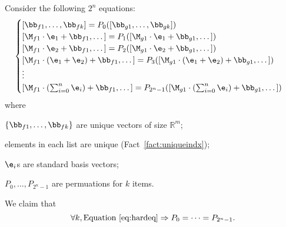 \begin{claim}
Consider the following $2^n$ equations:
    \begin{align}
        \begin{cases}
            [\bb_{f1},\dots,\bb_{fk}] = P_0([\bb_{g1},\dots,\bb_{gk}])\\
            [\M_{f1}\cdot \e_1 + \bb_{f1},\dots] = P_1([\M_{g1}\cdot \e_1 + \bb_{g1}, \dots])\\
            [\M_{f1}\cdot \e_2 + \bb_{f1},\dots] = P_2([\M_{g1}\cdot \e_2 + \bb_{g1}, \dots])\\
            [\M_{f1}\cdot (\e_1+\e_2) + \bb_{f1},\dots] = P_3([\M_{g1}\cdot (\e_1+\e_2) + \bb_{g1}, \dots])\\
            \vdots\\
            [\M_{f1}\cdot (\sum_{i=0}^{n}\e_i) + \bb_{f1},\dots] = P_{2^n-1}([\M_{g1}\cdot (\sum_{i=0}^n\e_i) + \bb_{g1}, \dots])
        \end{cases}
        \label{eq:hardeq}
    \end{align}
    where
    \begin{myitemize}
        \item $\{\bb_{f1},\dots,\bb_{fk}\}$ are unique vectors of size $\mathbb{R}^m$;
        \item elements in each list are unique (Fact~\ref{fact:uniqueindx});
        \item $\e_i$s are standard basis vectors;
        \item $P_0, \dots, P_{2^n-1}$ are permuations for $k$ items.
    \end{myitemize}

    We claim that
 \[
     \forall k, \text{Equation~\ref{eq:hardeq}} \Rightarrow P_0=\cdots=P_{2^n-1}.
\]
    \label{claim:hard2prove}
\end{claim}


